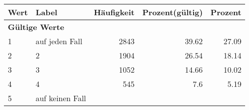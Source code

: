      \begin{longtable}{lXrrr}
     \toprule
     \textbf{Wert} & \textbf{Label} & \textbf{Häufigkeit} & \textbf{Prozent(gültig)} & \textbf{Prozent} \\
     \endhead
     \midrule
     \multicolumn{5}{l}{\textbf{Gültige Werte}}\\

     1 &
     \multicolumn{1}{X}{ auf jeden Fall   } &


       \num{2843} &
       \num[round-mode=places,round-precision=2]{39.62} &
         \num[round-mode=places,round-precision=2]{27.09} \\

     2 &
     \multicolumn{1}{X}{ 2   } &


       \num{1904} &
       \num[round-mode=places,round-precision=2]{26.54} &
         \num[round-mode=places,round-precision=2]{18.14} \\

     3 &
     \multicolumn{1}{X}{ 3   } &


       \num{1052} &
       \num[round-mode=places,round-precision=2]{14.66} &
         \num[round-mode=places,round-precision=2]{10.02} \\

     4 &
     \multicolumn{1}{X}{ 4   } &


       \num{545} &
       \num[round-mode=places,round-precision=2]{7.6} &
         \num[round-mode=places,round-precision=2]{5.19} \\

     5 &
     \multicolumn{1}{X}{ auf keinen Fall   } &



\end{longtable}
